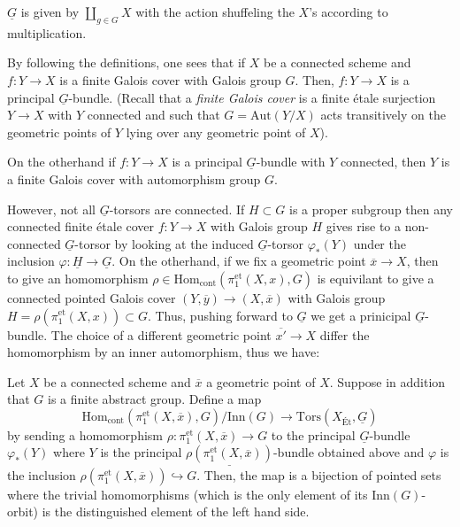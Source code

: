 $\underline{G}$ is given by $\coprod_{g \in G} X$ with the action shuffeling the $X$'s according to multiplication.

By following the definitions, one sees that if $X$ be a connected scheme and $f : Y \to X$ is a finite Galois cover with Galois group $G$. 
Then, $f : Y \to X$ is a principal $\underline{G}$-bundle.
(Recall that a \textit{finite Galois cover} is a finite étale surjection $Y \to X$ with $Y$ connected and such that 
$G = \text{Aut}(Y/X)$ acts transitively on the geometric points of $Y$ lying over any geometric point of $X$).

On the otherhand if $f: Y \to X$ is a principal $\underline{G}$-bundle with $Y$ connected, then $Y$ is a finite Galois cover with
automorphism group $G$.

However, not all $\underline{G}$-torsors are connected. If $H\subset G$ is a proper subgroup then any connected finite \'etale cover $f: Y \to X$ with 
Galois group $H$ gives rise to a non-connected $\underline{G}$-torsor by looking at the induced $\underline{G}$-torsor $\varphi_*(Y)$ under the inclusion $\varphi: \underline{H} \to \underline{G}$.
On the otherhand, if we fix a geometric point $\overline{x} \to X$, then to give an homomorphism
$\rho \in \mathrm{Hom}_{\mathrm{cont}}(\pi_1^{\mathrm{et}}(X, x), G)$ is equivilant to give a connected pointed Galois cover
$(Y, \overline{y}) \to (X, \overline{x})$ with Galois group $H=\rho(\pi_1^{\mathrm{et}}(X, x)) \subset G$. 
Thus, pushing forward to $\underline{G}$ we get a prinicipal $\underline{G}$-bundle. The choice of a different geometric point $\overline{x'} \to X$
differ the homomorphism by an inner automorphism, thus we have:

\begin{theorem}\label{theorem:equivalence_fundamental_covers}
    Let $X$ be a connected scheme and $\overline{x}$ a geometric point of $X$. Suppose in addition that $G$ is a finite abstract group. 
    Define a map
    \begin{equation}
        \mathrm{Hom}_{\mathrm{cont}}(\pi_1^{\mathrm{et}}(X, \overline{x}), G) / \mathrm{Inn}(G) \to \mathrm{Tors}(X_{\text{\'Et}}, \underline{G}) 
    \end{equation}
by sending a homomorphism $\rho : \pi_1^{\mathrm{et}}(X, \overline{x}) \to G$ 
to the principal $\underline{G}$-bundle $\varphi_*(Y)$ where $Y$ is the principal $\underline{\rho(\pi_1^{\mathrm{et}}(X, \overline{x}))}$-bundle 
obtained above and $\varphi$ is the inclusion $\rho(\pi_1^{\mathrm{et}}(X, \overline{x})) \hookrightarrow G$. Then, the map 
 is a bijection of pointed sets where the trivial homomorphisms
  (which is the only element of its $\mathrm{Inn}(G)$-orbit) is the distinguished element of the left hand side.
\end{theorem}

